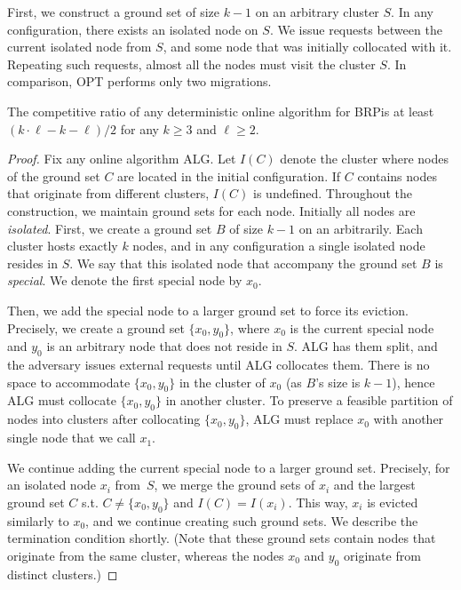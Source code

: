 \documentclass[manuscript,screen=true, review, anonymous]{acmart}
\newcommand{\OPT}{\textsf{OPT}\xspace}
\newcommand{\ALG}{\textsf{ALG}\xspace}
\newcommand{\OBRP}{BRP}
\begin{document}
First, we construct a ground set of size $k-1$ on an arbitrary cluster $S$.
In any configuration, there exists an isolated node on $S$.
We issue requests between the current isolated node from $S$, and some node that was initially collocated with it.
Repeating such requests, almost all the nodes must visit the cluster $S$.
In comparison, \OPT performs only two migrations.

\begin{theorem}
	\label{th:lowerbound}
	The competitive ratio of any deterministic online algorithm for \OBRP is at least $(k\cdot \ell - k - \ell)/2$ for any $k\geq 3$ and $\ell \geq 2$.
\end{theorem}

\begin{proof}
	Fix any online algorithm \ALG{}.
	Let $I(C)$ denote the cluster where nodes of the ground set $C$ are located in the initial configuration.
	If $C$ contains nodes that originate from different clusters, $I(C)$ is undefined.
	Throughout the construction, we maintain ground sets for each node.
	Initially all nodes are \emph{isolated}.
	First, we create a ground set $B$ of size $k-1$ on an arbitrarily.
	Each cluster hosts exactly $k$ nodes, and in any configuration a single isolated node resides in $S$.
	We say that this isolated node that accompany the ground set $B$ is \emph{special}.
	We denote the first special node by $x_0$.

	Then, we add the special node to a larger ground set to force its eviction.
	Precisely,
	we create a ground set $\{x_0, y_0\}$, 
	where $x_0$ is the current special node and $y_0$ is an arbitrary node that does not reside in $S$.
	\ALG has them split, and the adversary issues external requests until \ALG collocates them.
	There is no space to accommodate $\{x_0, y_0\}$ in the cluster of $x_0$ (as $B$'s size is $k-1$), hence \ALG must collocate $\{x_0, y_0\}$ in another cluster.
	To preserve a feasible partition of nodes into clusters after collocating $\{x_0, y_0\}$,
	\ALG must replace $x_0$ with another single node that we call $x_1$.

	We continue adding the current special node to a larger ground set.
	Precisely, for an isolated node $x_i$ from~$S$, we merge the ground sets of $x_i$ and the largest ground set $C$ s.t. $C \neq \{x_0,y_0\}$ and $I(C) = I(x_i)$.
	This way, $x_i$ is evicted similarly to $x_0$, and we continue creating such ground sets.
	We describe the termination condition shortly.
	(Note that these ground sets contain nodes that originate from the same cluster, whereas the nodes $x_0$ and $y_0$ originate from distinct clusters.)


\end{proof}
\end{document}
